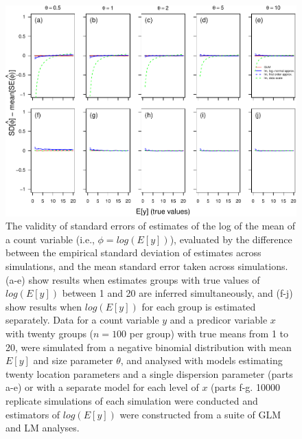 \documentclass[]{article}
\begin{document}
\begin{figure}[h]

{\centering \includegraphics{revisiting_count_data_advice_files/figure-latex/SEPerformanceFigureLog-1} 

}

\caption{The validity of standard errors of estimates of the log of the mean of a count variable (i.e., $\phi=log(E[y])$), evaluated by the difference between the empirical standard deviation of estimates across simulations, and the mean standard error taken across simulations.  (a-e) show results when estimates groups with true values of $log(E[y])$ between 1 and 20 are inferred simultaneously, and (f-j) show results when $log(E[y])$ for each group is estimated separately. Data for a count variable $y$ and a predicor variable $x$ with twenty groups ($n=100$ per group) with true means from 1 to 20, were simulated from a negative binomial distribution with mean $E[y]$ and size parameter $\theta$, and analysed with models estimating twenty location parameters and a single dispersion parameter (parts a-e) or with a separate model for each level of $x$ (parts f-g. 10000 replicate simulations of each simulation were conducted and estimators of $log(E[y])$ were constructed from a suite of GLM and LM analyses.}\label{fig:SEPerformanceFigureLog}
\end{figure}
\end{document}
